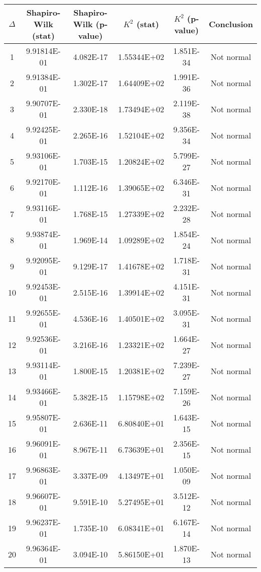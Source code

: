 \begin{table}[h]
	\begin{tabular}{|c|c|c|c|c|c|}
		\hline
		$\Delta$ &  Shapiro-Wilk (stat) & Shapiro-Wilk (p-value) & $K^2$ (stat) & $K^2$ (p-value) & Conclusion\\\hline
		\hline
		1 & 9.91814E-01 & 4.082E-17 & 1.55344E+02 & 1.851E-34 & Not normal\\\hline
		2 & 9.91384E-01 & 1.302E-17 & 1.64409E+02 & 1.991E-36 & Not normal\\\hline
		3 & 9.90707E-01 & 2.330E-18 & 1.73494E+02 & 2.119E-38 & Not normal\\\hline
		4 & 9.92425E-01 & 2.265E-16 & 1.52104E+02 & 9.356E-34 & Not normal\\\hline
		5 & 9.93106E-01 & 1.703E-15 & 1.20824E+02 & 5.799E-27 & Not normal\\\hline
		6 & 9.92170E-01 & 1.112E-16 & 1.39065E+02 & 6.346E-31 & Not normal\\\hline
		7 & 9.93116E-01 & 1.768E-15 & 1.27339E+02 & 2.232E-28 & Not normal\\\hline
		8 & 9.93874E-01 & 1.969E-14 & 1.09289E+02 & 1.854E-24 & Not normal\\\hline
		9 & 9.92095E-01 & 9.129E-17 & 1.41678E+02 & 1.718E-31 & Not normal\\\hline
		10 & 9.92453E-01 & 2.515E-16 & 1.39914E+02 & 4.151E-31 & Not normal\\\hline
		11 & 9.92655E-01 & 4.536E-16 & 1.40501E+02 & 3.095E-31 & Not normal\\\hline
		12 & 9.92536E-01 & 3.216E-16 & 1.23321E+02 & 1.664E-27 & Not normal\\\hline
		13 & 9.93114E-01 & 1.800E-15 & 1.20381E+02 & 7.239E-27 & Not normal\\\hline
		14 & 9.93466E-01 & 5.382E-15 & 1.15798E+02 & 7.159E-26 & Not normal\\\hline
		15 & 9.95807E-01 & 2.636E-11 & 6.80840E+01 & 1.643E-15 & Not normal\\\hline
		16 & 9.96091E-01 & 8.967E-11 & 6.73639E+01 & 2.356E-15 & Not normal\\\hline
		17 & 9.96863E-01 & 3.337E-09 & 4.13497E+01 & 1.050E-09 & Not normal\\\hline
		18 & 9.96607E-01 & 9.591E-10 & 5.27495E+01 & 3.512E-12 & Not normal\\\hline
		19 & 9.96237E-01 & 1.735E-10 & 6.08341E+01 & 6.167E-14 & Not normal\\\hline
		20 & 9.96364E-01 & 3.094E-10 & 5.86150E+01 & 1.870E-13 & Not normal\\\hline

\end{tabular}
\end{table}
